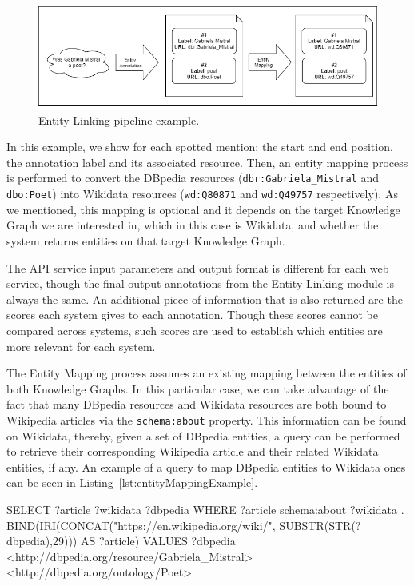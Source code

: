\begin{figure}[!h]
    \centering
    \includegraphics[scale=.5]{imagenes/3_system_overview/individualEntityLinkingPipeline.png}
    \caption{Entity Linking pipeline example.}
    \label{fig:entityLinkingPipeline}
\end{figure}

In this example, we show for each spotted mention: the start and end position, the annotation 
label and its associated resource. Then, an entity mapping process is performed to convert 
the DBpedia resources (\texttt{dbr:Gabriela\_Mistral} and \texttt{dbo:Poet}) into Wikidata 
resources (\texttt{wd:Q80871} and \texttt{wd:Q49757} respectively). As we mentioned, this 
mapping is optional and it depends on the target Knowledge Graph we are interested in, which 
in this case is Wikidata, and whether the system returns entities on that target Knowledge 
Graph.

The API service input parameters and output format is different for each web service, though 
the final output annotations from the Entity Linking module is always the same. An additional 
piece of information that is also returned are the scores each system gives to each annotation. 
Though these scores cannot be compared across systems, such scores are used to establish 
which entities are more relevant for each system. 

The Entity Mapping process assumes an existing mapping between the entities of both Knowledge 
Graphs. In this particular case, we can take advantage of the fact that many DBpedia resources 
and Wikidata resources are both bound to Wikipedia articles via the \texttt{schema:about} property. 
This information can be found on Wikidata, thereby, given a set of DBpedia entities, a \SPARQL{} 
query can be performed to retrieve their corresponding Wikipedia article and their related 
Wikidata entities, if any. An example of a \SPARQL{} query to map DBpedia entities to Wikidata 
ones can be seen in Listing~\ref{lst:entityMappingExample}.

\begin{sparqlcode}[%
    caption={\SPARQL{} query example to map DBpedia resources to Wikidata ones.}, 
    label={lst:entityMappingExample}]
SELECT ?article ?wikidata ?dbpedia WHERE {
    ?article schema:about ?wikidata .
    BIND(IRI(CONCAT("https://en.wikipedia.org/wiki/", SUBSTR(STR(?dbpedia),29))) AS ?article)
    VALUES ?dbpedia { <http://dbpedia.org/resource/Gabriela_Mistral> <http://dbpedia.org/ontology/Poet> }
}
\end{sparqlcode}

